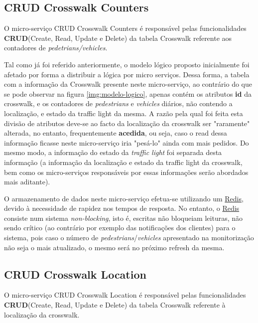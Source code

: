 \documentclass[acmsmall,nonacm,screen]{acmart}
\begin{document}
\subsection{CRUD Crosswalk Counters}
\hspace{5mm} O micro-serviço CRUD Crosswalk Counters é responsável pelas funcionalidades \textbf{CRUD}(Create, Read, Update e Delete) da tabela Crosswalk referente aos contadores de \textit{pedetrians/vehicles}.

\hspace{5mm}Tal como já foi referido anteriormente, o modelo lógico proposto inicialmente foi afetado por forma a distribuir a lógica por micro serviços. Dessa forma, a tabela com a informação da Crosswalk presente neste micro-serviço, ao contrário do que se pode observar na figura \ref{img:modelo-logico}, apenas contém os atributos \textbf{id} da crosswalk, e os contadores de \textit{pedestrians} e \textit{vehicles} diários, não contendo a localização, e estado da traffic light da mesma. A razão pela qual foi feita esta divisão de atributos deve-se ao facto da localização da crosswalk ser "raramente" alterada, no entanto, frequentemente  \textbf{acedida}, ou seja, caso o read dessa informação ficasse neste micro-serviço iria "pesá-lo" ainda com mais pedidos. Do mesmo modo, a informação do estado da \textit{traffic light} foi separada desta informação (a informação da localização e estado da traffic light da crosswalk, bem como os micro-serviços responsáveis por essas informações serão abordados mais aditante).

\hspace{5mm} O armazenamento de dados neste micro-serviço efetua-se utilizando um \href{https://redis.io/}{Redis}, devido à necessidade de rapidez nos tempos de resposta. No entanto, o \href{https://redis.io/}{Redis} consiste num sistema \textit{non-blocking}, isto é, escritas não bloqueiam leituras, não sendo crítico (ao contrário por exemplo das notificações dos clientes) para o sistema, pois caso o número de \textit{pedestrians}/\textit{vehicles} apresentado na monitorização não seja o mais atualizado, o mesmo será no próximo refresh da mesma.

\subsection{CRUD Crosswalk Location}
\label{traffic_light} 

\hspace{5mm} O micro-serviço CRUD Crosswalk Location é responsável pelas funcionalidades \textbf{CRUD}(Create, Read, Update e Delete) da tabela Crosswalk referente à localização da crosswalk.
\end{document}
